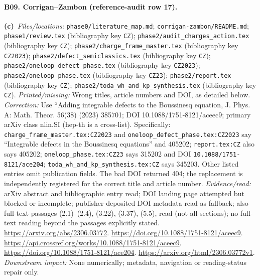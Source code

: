 \documentclass[11pt,a4paper]{article}
\newcommand{\C}{\textbf{(c)}\ }
\newcommand{\file}[1]{\nolinkurl{#1}}
\begin{document}
\paragraph{B09. Corrigan--Zambon (reference-audit row 17).}
\C \textit{Files/locations:} \file{phase0/literature_map.md}; \file{corrigan-zambon/README.md}; \file{phase1/review.tex} (bibliography key \file{CZ}); \file{phase2/audit_charges_action.tex} (bibliography key \file{CZ}); \file{phase2/charge_frame_master.tex} (bibliography key \file{CZ2023}); \file{phase2/defect_semiclassics.tex} (bibliography key \file{CZ}); \file{phase2/oneloop_defect_phase.tex} (bibliography key \file{CZ2023}); \file{phase2/oneloop_phase.tex} (bibliography key \file{CZ23}); \file{phase2/report.tex} (bibliography key \file{CZ}); \file{phase2/toda_wh_and_kp_synthesis.tex} (bibliography key \file{CZ}).
\textit{Printed/missing:} Wrong titles, article numbers and DOI, as detailed below.
\textit{Correction:} Use ``Adding integrable defects to the Boussinesq equation, J. Phys. A: Math. Theor. 56(38) (2023) 385701; DOI 10.1088/1751-8121/aceec9; primary arXiv class nlin.SI (hep-th is a cross-list).
Specifically: \file{charge_frame_master.tex:CZ2023} and
\file{oneloop_defect_phase.tex:CZ2023} say ``Integrable defects in the Boussinesq
equations'' and 405202; \file{report.tex:CZ} also says 405202;
\file{oneloop_phase.tex:CZ23} says 315202 and DOI \file{10.1088/1751-8121/ace204};
\file{toda_wh_and_kp_synthesis.tex:CZ} says 345203. Other listed entries omit
publication fields. The bad DOI returned 404; the replacement is independently
registered for the correct title and article number.
\textit{Evidence/read:} arXiv abstract and bibliographic entry read; DOI landing page attempted but blocked or incomplete; publisher-deposited DOI metadata read as fallback; also full-text passages (2.1)--(2.4), (3.22), (3.37), (5.5), read (not all sections); no full-text reading beyond the passages explicitly stated.
\url{https://arxiv.org/abs/2306.03772}.
\url{https://doi.org/10.1088/1751-8121/aceec9}.
\url{https://api.crossref.org/works/10.1088/1751-8121/aceec9}.
\url{https://doi.org/10.1088/1751-8121/ace204}.
\url{https://arxiv.org/html/2306.03772v1}.
\textit{Downstream impact:} None numerically; metadata, navigation or reading-status repair only.
\end{document}
